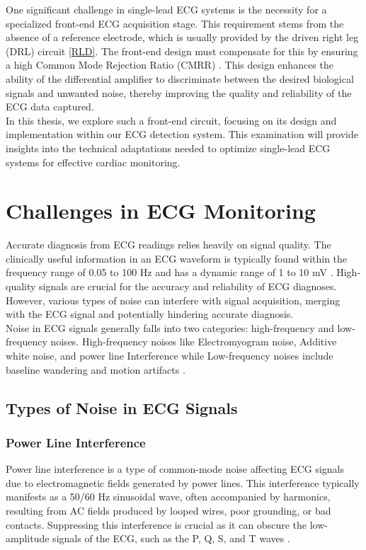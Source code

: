 \noindent One significant challenge in single-lead ECG systems is the necessity for a specialized front-end ECG acquisition stage. This requirement stems from the absence of a reference electrode, which is usually provided by the driven right leg (DRL) circuit \ref{RLD}. The front-end design must compensate for this by ensuring a high Common Mode Rejection Ratio (CMRR) \cite{babusiak2015}. This design enhances the ability of the differential amplifier to discriminate between the desired biological signals and unwanted noise, thereby improving the quality and reliability of the ECG data captured.\\

\noindent In this thesis, we explore such a front-end circuit, focusing on its design and implementation within our ECG detection system. This examination will provide insights into the technical adaptations needed to optimize single-lead ECG systems for effective cardiac monitoring.\\


\section{Challenges in ECG Monitoring}
\vspace{1em}
\noindent Accurate diagnosis from ECG readings relies heavily on signal quality. The clinically useful information in an ECG waveform is typically found within the frequency range of 0.05 to 100 Hz and has a dynamic range of 1 to 10 mV \cite{Velayudhan2016NoiseAA}. High-quality signals are crucial for the accuracy and reliability of ECG diagnoses. However, various types of noise can interfere with signal acquisition, merging with the ECG signal and potentially hindering accurate diagnosis.\\

\noindent Noise in ECG signals generally falls into two categories: high-frequency and low-frequency noises. High-frequency noises like Electromyogram noise, Additive white noise, and power line Interference while Low-frequency noises include baseline wandering and motion artifacts \cite{Velayudhan2016NoiseAA}.\\

\subsection{Types of Noise in ECG Signals}\label{noises}
\vspace{1em}
\subsubsection{Power Line Interference}
\vspace{1em}
\noindent Power line interference is a type of common-mode noise affecting ECG signals due to electromagnetic fields generated by power lines. This interference typically manifests as a 50/60 Hz sinusoidal wave, often accompanied by harmonics, resulting from AC fields produced by looped wires, poor grounding, or bad contacts. Suppressing this interference is crucial as it can obscure the low-amplitude signals of the ECG, such as the P, Q, S, and T waves \cite{Velayudhan2016NoiseAA,Kher2019SignalPT}.

